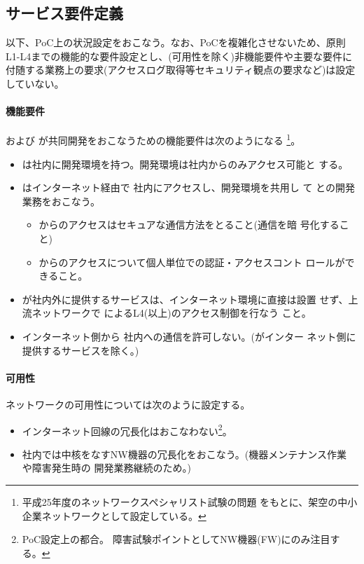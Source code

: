   \subsection{サービス要件定義}

以下、PoC上の状況設定をおこなう。なお、PoCを複雑化させないため、原則
L1-L4までの機能的な要件設定とし、(可用性を除く)非機能要件や主要な要件に
付随する業務上の要求(アクセスログ取得等セキュリティ観点の要求など)は設定
していない。

    \paragraph{機能要件}
\yo および \tj が共同開発をおこなうための機能要件は次のようになる
\footnote{平成25年度のネットワークスペシャリスト試験の問題\cite{h25nwsp}
をもとに、架空の中小企業ネットワークとして設定している。}。
\begin{itemize}
 \item \yo は社内に開発環境を持つ。開発環境は社内からのみアクセス可能と
       する。
 \item \tj はインターネット経由で \yo 社内にアクセスし、開発環境を共用し
       て \yo との開発業務をおこなう。
       \begin{itemize}
        \item \tj からのアクセスはセキュアな通信方法をとること(通信を暗
              号化すること)
        \item \tj からのアクセスについて個人単位での認証・アクセスコント
              ロールができること。
       \end{itemize}
 \item \yo が社内外に提供するサービスは、インターネット環境に直接は設置
       せず、上流ネットワークで \yo によるL4(以上)のアクセス制御を行なう
       こと。
 \item インターネット側から \yo 社内への通信を許可しない。(\yo がインター
       ネット側に提供するサービスを除く。)
\end{itemize}

    \paragraph{可用性}

ネットワークの可用性については次のように設定する。
\begin{itemize}
 \item インターネット回線の冗長化はおこなわない\footnote{PoC設定上の都合。
       障害試験ポイントとしてNW機器(FW)にのみ注目する。}。
 \item 社内では中核をなすNW機器の冗長化をおこなう。(機器メンテナンス作業
       や障害発生時の \tj 開発業務継続のため。)
\end{itemize}

